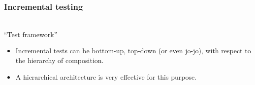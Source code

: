 
\begin{frame}
\frametitle{Incremental testing}
\begin{center}
\\
"`Test framework"'
\end{center}
 
\begin{itemize}
	\item Incremental tests can be bottom-up, top-down (or even jo-jo), with respect to the hierarchy of composition.
	\item A hierarchical architecture is very effective for this purpose.
\end{itemize}
\end{frame}
